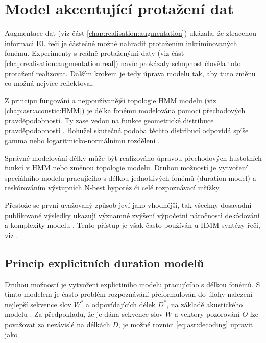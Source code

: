 \section{Model akcentující protažení dat}
\label{chap:realisation:durationmodels}

Augmentace dat (viz část \ref{chap:realisation:augmentation}) ukázala, že ztracenou informaci EL řeči je částečné možné nahradit protažením inkriminovaných fonémů. Experimenty s reálně protaženými daty (viz část \ref{chap:realisation:augmentation:real}) navíc prokázaly schopnost člověla toto protažení realizovat. Dalším krokem je tedy úprava modelu tak, aby tuto změnu co možná nejvíce reflektoval.

Z principu fungování a nejpoužívanější topologie HMM modelu (viz \ref{chap:asr:acoustic:HMM}) je délka fonému modelována pomocí přechodových pravděpodobností. Ty zase vedou na funkce geometrické distribuce pravděpodobnosti \cite{Rabiner1989}. Bohužel skutečná podoba těchto distribucí odpovídá spíše gamma nebo logaritmicko-normálnímu rozdělení \cite{Alumae2014}.

Správné modelování délky může být realizováno úpravou přechodových hustotních funkcí v HMM nebo změnou topologie modelu. Druhou možností je vytvoření speciálního modelu pracujícího s délkou jednotlivých fonémů (duration model) a reskórováním výstupních N-best hypotéz či celé rozpoznávací mřížky.

Přestože se první uvažovaný způsob jeví jako vhodnější, tak všechny dosavadní publikované výsledky ukazují významné zvýšení výpočetní náročnosti dekódování a komplexity modelu \cite{Rabiner1989} \cite{Pylkkonen2004} \cite{Russell1985}. Tento přístup je však často používán u HMM syntézy řeči, viz \cite{Yoshimura1998}.

\subsection{Princip explicitních duration modelů}
\label{chap:realisation:durationmodels:model}

Druhou možností je vytvoření explictiního modelu pracujícího s délkou fonémů. S tímto modelem je často problém rozpoznávání přeformulován do úlohy nalezení nejlepší sekvence slov $W^{*}$ a odpovídajících délek $D^{*}$, na základě akustického modelu \cite{Alumae2014}. Za předpokladu, že je dána sekvence slov $W$ a vektory pozorování $O$ lze považovat za nezávislé na délkách $D$, je možné rovnici \ref{eq:asr:decoding} upravit jako

